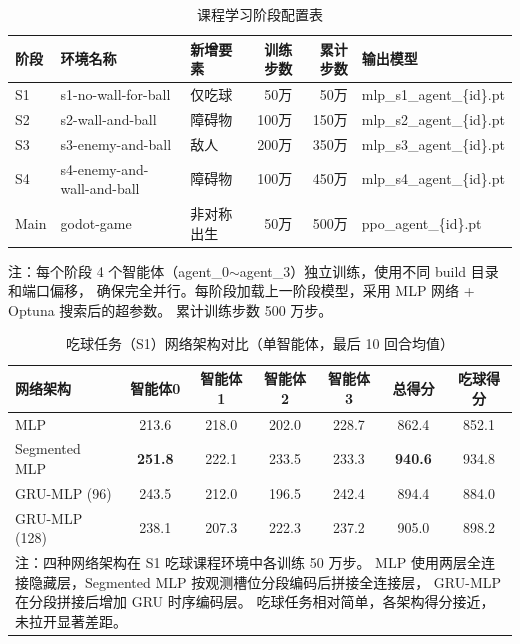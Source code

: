 \begin{table}[htbp]
  \centering
  \caption{ 课程学习阶段配置表}
  \label{tab:appendix_curriculum}
  \begin{tabular}{lllrrl}
    \toprule
    阶段 & 环境名称 & 新增要素 & 训练步数 & 累计步数 & 输出模型 \\
    \midrule
    S1 & s1-no-wall-for-ball        & 仅吃球       & 50万   & 50万   & mlp\_s1\_agent\_\{id\}.pt \\
    S2 & s2-wall-and-ball          & 障碍物      & 100万  & 150万  & mlp\_s2\_agent\_\{id\}.pt \\
    S3 & s3-enemy-and-ball         & 敌人        & 200万  & 350万  & mlp\_s3\_agent\_\{id\}.pt \\
    S4 & s4-enemy-and-wall-and-ball & 障碍物      & 100万  & 450万  & mlp\_s4\_agent\_\{id\}.pt \\
    Main & godot-game              & 非对称出生  & 50万   & 500万  & ppo\_agent\_\{id\}.pt \\
    \bottomrule
  \end{tabular}
  \vspace{6pt}
  
  {\small 注：每个阶段 4 个智能体（agent\_0$\sim$agent\_3）独立训练，使用不同 build 目录和端口偏移，
  确保完全并行。每阶段加载上一阶段模型，采用 MLP 网络 + Optuna 搜索后的超参数。
  累计训练步数 500 万步。}
\end{table}


\begin{table}[htbp]
  \centering
  \caption{ 吃球任务（S1）网络架构对比（单智能体，最后 10 回合均值）}
  \label{tab:appendix_s1_network}
  \begin{tabular}{lcccc|cc}
    \toprule
    网络架构 & 智能体0 & 智能体1 & 智能体2 & 智能体3 & 总得分 & 吃球得分 \\
    \midrule
    MLP & 213.6 & 218.0 & 202.0 & 228.7 & 862.4 & 852.1 \\
    Segmented MLP &  \textbf{251.8} & 222.1 & 233.5 & 233.3 &  \textbf{940.6} & 934.8 \\
    GRU-MLP (96) & 243.5 & 212.0 & 196.5 & 242.4 & 894.4 & 884.0 \\
    GRU-MLP (128) & 238.1 & 207.3 & 222.3 & 237.2 & 905.0 & 898.2 \\
    \midrule
    \multicolumn{7}{p{0.85\textwidth}}{%
      \small 注：四种网络架构在 S1 吃球课程环境中各训练 50 万步。
      MLP 使用两层全连接隐藏层，Segmented MLP 按观测槽位分段编码后拼接全连接层，
      GRU-MLP 在分段拼接后增加 GRU 时序编码层。
      吃球任务相对简单，各架构得分接近，未拉开显著差距。} \\
    \bottomrule
  \end{tabular}
\end{table}
